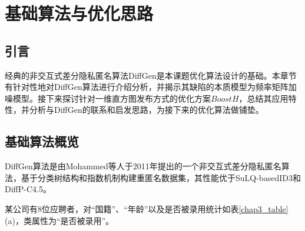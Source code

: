 
\raggedbottom
\chapter{基础算法与优化思路}
\label{chap:algorithm}

\section{引言}
经典的非交互式差分隐私匿名算法DiffGen是本课题优化算法设计的基础。本章节有针对性地对DiffGen算法进行介绍分析，并揭示其缺陷的本质模型为频率矩阵加噪模型。接下来探讨针对一维直方图发布方式的优化方案$BoostH$，总结其应用特性，并分析与DiffGen的联系和启发思路，为接下来的优化算法做铺垫。

\section{基础算法概览}

DiffGen算法是由Mohammed等人于2011年提出的一个非交互式差分隐私匿名算法\supercite{DiffGen}，基于分类树结构和指数机制构建重匿名数据集，其性能优于SuLQ-basedID3和DiffP-C4.5。
\begin{exmp}
	\label{chap3_exmp}
	某公司有8位应聘者，对“国籍”、“年龄”以及是否被录用统计如表\ref{chap3_table}(a)，类属性为“是否被录用”。
\end{exmp}

